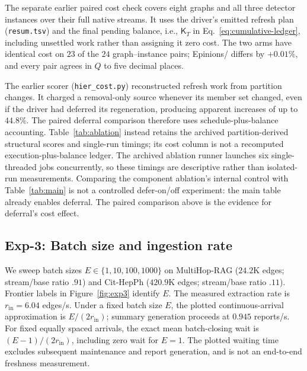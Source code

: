  The separate earlier paired cost check covers eight graphs
and all three detector instances over their full native streams. It uses
the driver's emitted refresh plan (\texttt{resum.tsv}) and the final pending
balance, i.e., $\mathsf K_T$ in Eq.~\ref{eq:cumulative-ledger}, including
unsettled work rather than assigning it zero cost. The two arms have identical
cost on $23$ of the $24$ graph--instance pairs; Epinions/\Louvain{} differs by
$+0.01\%$, and every pair agrees in $Q$ to five decimal places.

The earlier scorer (\texttt{hier\_cost.py}) reconstructed refresh work from
partition changes. It charged a removal-only source whenever its member set
changed, even if the driver had deferred its regeneration, producing apparent
increases of up to $44.8\%$. The paired deferral comparison therefore uses
schedule-plus-balance accounting. Table~\ref{tab:ablation} instead retains
the archived partition-derived structural scores and single-run timings;
its cost column is not a recomputed execution-plus-balance ledger.
The archived ablation runner launches six single-threaded jobs concurrently,
so these timings are descriptive rather than isolated-run measurements.
Comparing the component ablation's
internal control with Table~\ref{tab:main} is not a controlled defer-on/off
experiment: the main table already enables deferral.
The paired comparison above is the evidence for deferral's cost effect.

\subsection{Exp-3: Batch size and ingestion rate}
\label{app:exp3-detail}

We sweep batch sizes $E\in\{1,10,100,1000\}$ on MultiHop-RAG
($24.2$K edges; stream/base ratio $.91$) and Cit-HepPh
($420.9$K edges; stream/base ratio $.11$). Frontier labels in
Figure~\ref{fig:exp3} identify $E$.
The measured extraction rate is $r_{\mathrm{in}}=6.04$ edges/s. Under a fixed
batch size $E$, the plotted continuous-arrival approximation is
$E/(2r_{\mathrm{in}})$; summary generation proceeds at $0.945$ reports/s.
For fixed equally spaced arrivals, the exact mean batch-closing wait is
$(E-1)/(2r_{\mathrm{in}})$, including zero wait for $E=1$.
The plotted waiting time excludes subsequent maintenance and report generation,
and is not an end-to-end freshness measurement.

